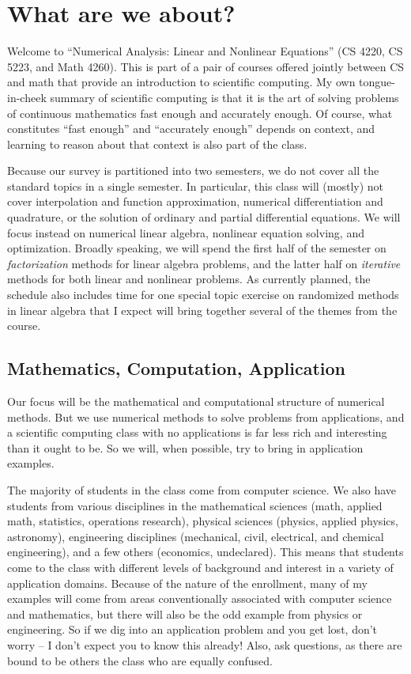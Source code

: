 \documentclass[12pt, leqno]{article}
\begin{document}

\section*{What are we about?}

Welcome to ``Numerical Analysis: Linear and Nonlinear Equations'' (CS
4220, CS 5223, and Math 4260).  This is part of a pair of courses
offered jointly between CS and math that provide an introduction to
scientific computing.  My own tongue-in-cheek summary of scientific
computing is that it is the art of solving problems of continuous
mathematics fast enough and accurately enough.  Of course, what
constitutes ``fast enough'' and ``accurately enough'' depends on
context, and learning to reason about that context is also part of the
class.

Because our survey is partitioned into two semesters, we do not cover
all the standard topics in a single semester.  In particular, this
class will (mostly) not cover interpolation and function
approximation, numerical differentiation and quadrature, or the
solution of ordinary and partial differential equations.  We will
focus instead on numerical linear algebra, nonlinear equation solving,
and optimization.  Broadly speaking, we will spend the first half of
the semester on {\em factorization} methods for linear algebra
problems, and the latter half on {\em iterative} methods for both
linear and nonlinear problems.  As currently planned, the schedule
also includes time for one special topic exercise on randomized
methods in linear algebra that I expect will bring together several of
the themes from the course.

\subsection*{Mathematics, Computation, Application}

Our focus will be the mathematical and computational structure of
numerical methods.  But we use numerical methods to solve
problems from applications, and a scientific computing class with
no applications is far less rich and interesting than it ought to be.
So we will, when possible, try to bring in application examples.

The majority of students in the class come from computer science.  We
also have students from various disciplines in the mathematical
sciences (math, applied math, statistics, operations research),
physical sciences (physics, applied physics, astronomy), engineering
disciplines (mechanical, civil, electrical, and chemical engineering),
and a few others (economics, undeclared).  This means that students
come to the class with different levels of background and interest in
a variety of application domains.  Because of the nature of the
enrollment, many of my examples will come from areas conventionally
associated with computer science and mathematics, but there will also
be the odd example from physics or engineering.  So if we dig into an
application problem and you get lost, don't worry -- I don't expect
you to know this already!  Also, ask questions, as there are bound to
be others the class who are equally confused.
\end{document}
